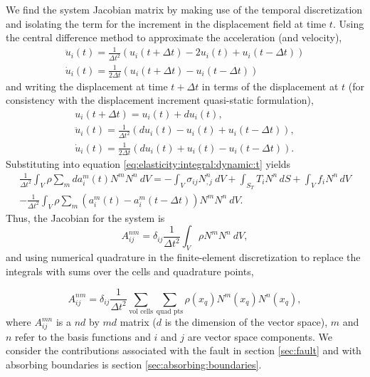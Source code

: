 We find the system Jacobian matrix by making use of the temporal discretization
and isolating the term for the increment in the displacement field
at time $t$. Using the central difference method to approximate the
acceleration (and velocity),
\begin{gather}
\ddot{u}_{i}(t)=\frac{1}{\Delta t^{2}}\left(u_{i}(t+\Delta t)-2u_{i}(t)+u_{i}(t-\Delta t)\right)\\
\dot{u}_{i}(t)=\frac{1}{2\Delta t}\left(u_{i}(t+\Delta t)-u_{i}(t-\Delta t)\right)
\end{gather}
and writing the displacement at time $t+\Delta t$ in terms of the
displacement at $t$ (for consistency with the displacement increment
quasi-static formulation),
\begin{gather}
u_{i}(t+\Delta t)=u_{i}(t)+du_{i}(t),\\
\ddot{u}_{i}(t)=\frac{1}{\Delta t^{2}}\left(du_{i}(t)-u_{i}(t)+u_{i}(t-\Delta t)\right),\\
\dot{u}_{i}(t)=\frac{1}{2\Delta t}\left(du_{i}(t)+u_{i}(t)-u_{i}(t-\Delta t)\right).
\end{gather}
Substituting into equation \eqref{eq:elasticity:integral:dynamic:t}
yields
\begin{multline}
\frac{1}{\Delta t^{2}}\int_{V}\rho\sum_{m}da_{i}^{m}(t)N^{m}N^{n}\ dV=-\int_{V}\sigma_{ij}N_{,j}^{n}\: dV+\int_{S_{T}}T_{i}N^{n}\, dS+\int_{V}f_{i}N^{n}\, dV\\
-\frac{1}{\Delta t^{2}}\int_{V}\rho\sum_{m}(a_{i}^{m}(t)-a_{i}^{m}(t-\Delta t))N^{m}N^{n}\ dV.
\end{multline}
Thus, the Jacobian for the system is
\begin{equation}
A_{ij}^{nm}=\delta_{ij}\frac{1}{\Delta t^{2}}\int_{V}\rho N^{m}N^{n}\ dV,
\end{equation}
and using numerical quadrature in the finite-element discretization
to replace the integrals with sums over the cells and quadrature points,

\begin{equation}
A_{ij}^{nm}=\delta_{ij}\frac{1}{\Delta t^{2}}\sum_{\text{vol cells}}\sum_{\text{quad pts}}\rho(x_{q})N^{m}(x_{q})N^{n}(x_{q}),
\end{equation}
where $A_{ij}^{mn}$ is a $nd$ by $md$ matrix ($d$ is the dimension
of the vector space), $m$ and $n$ refer to the basis functions and
$i$ and $j$ are vector space components. We consider the contributions
associated with the fault in section \vref{sec:fault} and with absorbing
boundaries is section \vref{sec:absorbing:boundaries}.


